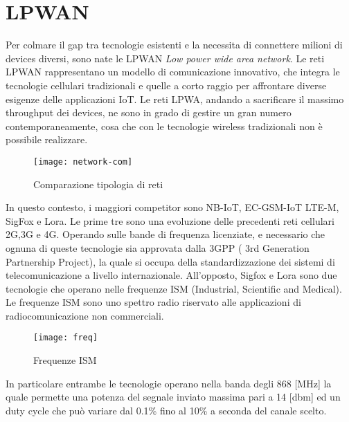 \section{LPWAN}
Per colmare il gap tra tecnologie esistenti e la
necessita di connettere milioni di devices diversi, sono nate le  LPWAN
\emph{Low power wide area network}.
Le reti LPWAN rappresentano un modello  di comunicazione
innovativo, che integra le tecnologie cellulari tradizionali e quelle a corto
raggio per affrontare diverse esigenze delle applicazioni IoT. 
Le reti LPWA, andando a sacrificare il massimo throughput dei devices, ne sono in
grado di gestire un gran numero contemporaneamente, cosa che con le tecnologie
wireless tradizionali non è possibile realizzare.

\begin{figure}[ht]
    \centering 
        \texttt{[image: network-com]}
    \caption{Comparazione tipologia di reti}
\end{figure}

In questo contesto, i maggiori competitor sono  NB-IoT, EC-GSM-IoT
LTE-M, SigFox e Lora. Le prime tre  sono una evoluzione delle precedenti reti
cellulari 2G,3G e 4G. Operando sulle bande di frequenza licenziate, e necessario
che ognuna di queste tecnologie sia approvata dalla 3GPP ( 3rd Generation
Partnership Project), la quale si occupa della standardizzazione dei sistemi di
telecomunicazione a livello internazionale.
All'opposto, Sigfox e Lora sono due tecnologie che operano nelle frequenze ISM
(Industrial, Scientific and Medical). Le frequenze ISM sono uno spettro radio
riservato alle applicazioni di radiocomunicazione non commerciali.

\begin{figure}[ht]
    \centering 
        \texttt{[image: freq]}
    \caption{Frequenze ISM}
\end{figure}

In particolare entrambe le tecnologie operano  nella banda degli 868 [MHz]
la quale permette una potenza del segnale inviato massima pari a 14 [dbm] ed un
duty cycle che può variare dal 0.1\% fino al 10\% a seconda del canale scelto.
 
